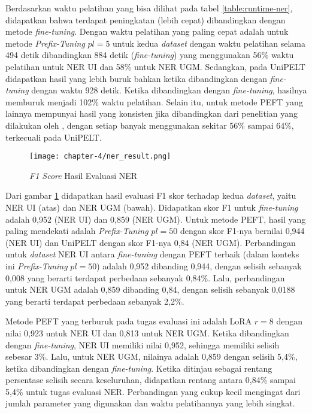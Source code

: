 Berdasarkan waktu pelatihan yang bisa dilihat pada tabel \ref{table:runtime-ner}, didapatkan bahwa terdapat peningkatan (lebih cepat) dibandingkan dengan metode \textit{fine-tuning}. Dengan waktu pelatihan yang paling cepat adalah untuk metode \textit{Prefix-Tuning} $pl=5$ untuk kedua \textit{dataset} dengan waktu pelatihan selama 494 detik dibandingkan 884 detik (\textit{fine-tuning}) yang menggunakan 56\% waktu pelatihan untuk NER UI dan 58\% untuk NER UGM. Sedangkan, pada UniPELT didapatkan hasil yang lebih buruk bahkan ketika dibandingkan dengan \textit{fine-tuning} dengan waktu 928 detik. Ketika dibandingkan dengan \textit{fine-tuning}, hasilnya memburuk menjadi 102\% waktu pelatihan. Selain itu, untuk metode PEFT yang lainnya mempunyai hasil yang konsisten jika dibandingkan dari penelitian yang dilakukan oleh \citeauthor{unipelt}, dengan setiap banyak menggunakan sekitar 56\% sampai 64\%, terkecuali pada UniPELT.

\begin{figure}[h]
    \centering
    \centerline{\texttt{[image: chapter-4/ner\_result.png]}}
    \caption{\textit{F1 Score} Hasil Evaluasi NER}
    \label{fig:ner-result}
\end{figure}

Dari gambar \ref{fig:ner-result} didapatkan hasil evaluasi F1 skor terhadap kedua \textit{dataset}, yaitu NER UI (atas) dan NER UGM (bawah). Didapatkan skor F1 untuk \textit{fine-tuning} adalah 0,952 (NER UI) dan 0,859 (NER UGM). Untuk metode PEFT, hasil yang paling mendekati adalah \textit{Prefix-Tuning} $pl=50$ dengan skor F1-nya bernilai 0,944 (NER UI) dan UniPELT dengan skor F1-nya 0,84 (NER UGM). Perbandingan untuk \textit{dataset} NER UI antara \textit{fine-tuning} dengan PEFT terbaik (dalam konteks ini \textit{Prefix-Tuning} $pl=50$) adalah 0,952 dibanding 0,944, dengan selisih sebanyak 0,008 yang berarti terdapat perbedaan sebanyak 0,84\%. Lalu, perbandingan untuk NER UGM adalah 0,859 dibanding 0,84, dengan selisih sebanyak 0,0188 yang berarti terdapat perbedaan sebanyak 2,2\%. 

Metode PEFT yang terburuk pada tugas evaluasi ini adalah LoRA $r=8$ dengan nilai 0,923 untuk NER UI dan 0,813 untuk NER UGM. Ketika dibandingkan dengan \textit{fine-tuning}, NER UI memiliki nilai 0,952, sehingga memiliki selisih sebesar 3\%. Lalu, untuk NER UGM, nilainya adalah 0,859 dengan selisih 5,4\%, ketika dibandingkan dengan \textit{fine-tuning}. Ketika ditinjau sebagai rentang persentase selisih secara keseluruhan, didapatkan rentang antara 0,84\% sampai 5,4\% untuk tugas evaluasi NER. Perbandingan yang cukup kecil mengingat dari jumlah parameter yang digunakan dan waktu pelatihannya yang lebih singkat.

